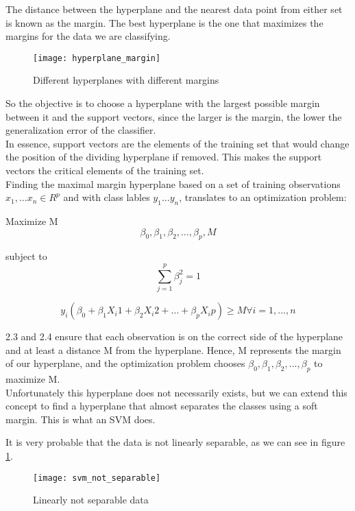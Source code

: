 The distance between the hyperplane and the nearest data point from either set is known as the margin. The best hyperplane is the one that maximizes the margins for the data we are classifying.\\
\begin{figure}[H]
	\centering
	\texttt{[image: hyperplane\_margin]}
	\caption{Different hyperplanes with different margins \cite{svm_monkeylearn}}
\end{figure}

So the objective is to choose a hyperplane with the largest possible margin between it and the support vectors, since the larger is the margin, the lower the generalization error of the classifier.\\
In essence, support vectors are the elements of the training set that would change the position of the dividing hyperplane if removed. This makes the support vectors the critical elements of the training set.\\

Finding the maximal margin hyperplane based on a set of training observations $x_1, \dots x_n \in R^p$ and with class lables $y_1 \dots y_n$, translates to an optimization problem:

Maximize M
\begin{equation}
\beta_0, \beta_1, \beta_2, \dots, \beta_p, M
\end{equation}

subject to
\begin{equation}
\sum_{j=1}^{p}\beta^2_j = 1
\end{equation}

\begin{equation}
y_i(\beta_0 + \beta_1 X_i1 + \beta_2 X_i2 + \dots + \beta_p X_ip) \ge M \forall i = 1, \dots, n
\end{equation}

2.3 and 2.4 ensure that each observation is on the correct side of the hyperplane and at least a distance M from the hyperplane. Hence, M represents the margin of our hyperplane, and the optimization problem chooses $\beta_0, \beta_1, \beta_2, \dots, \beta_p$ to maximize M. \\
Unfortunately this hyperplane does not necessarily exists, but we can extend this concept to find a hyperplane that almost separates the classes using a soft margin. This is what an SVM does.

It is very probable that the data is not linearly separable, as we can see in figure \ref{fig:svmnotsep}.
\begin{figure}[H]
	\centering
	\texttt{[image: svm\_not\_separable]}
	\caption{Linearly not separable data \cite{svm_monkeylearn}}
	\label{fig:svmnotsep}
\end{figure}


